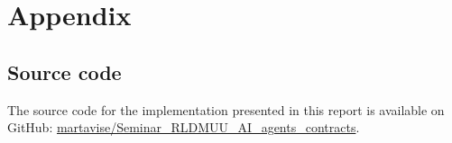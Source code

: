 \documentclass{article}
\theoremstyle{plain}
\theoremstyle{definition}
\theoremstyle{remark}
\begin{document}






\nocite{langley00}




\newpage
\appendix
\onecolumn
\section{Appendix}
\subsection{Source code}
The source code for the implementation presented in this report is available on GitHub:
\href{https://github.com/martavise/Seminar_RLDMUU_AI_agents_contracts}{martavise/Seminar\_RLDMUU\_AI\_agents\_contracts}.
\end{document}

